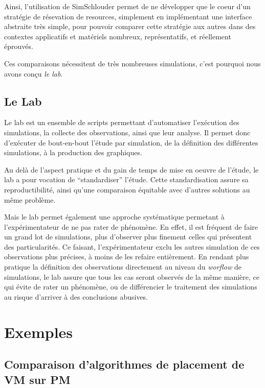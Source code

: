 \documentclass[parallelisme]{compas2017}
\begin{document}
Ainsi, l'utilisation de SimSchlouder permet de ne développer que le coeur d'un stratégie de résevation 
de resources, simplement en implémentant une interface abstraite très simple, pour pouvoir comparer cette 
stratégie aux autres dans des contextes applicatifs et matériels nombreux, représentatifs, et réellement 
éprouvés.

Ces comparaisons nécessitent de très nombreuses simulations, c'est pourquoi nous avons conçu \emph{le lab}.

\subsection{Le Lab}

Le lab est un ensemble de scripts permettant d'automatiser l'exécution des simulations, la collecte des
observations, ainsi que leur analyse. Il permet donc d'exécuter de bout-en-bout l'étude par simulation,
de la définition des différentes simulations, à la production des graphiques.

Au delà de l'aspect pratique et du gain de temps de mise en oeuvre de l'étude, le lab a pour vocation
de ``standardiser'' l'étude. Cette standardisation assure sa reproductibilité, ainsi qu'une comparaison
équitable avec d'autres solutions au même problème.

Mais le lab permet également une approche systématique permetant à l'expérimentateur de ne pas rater 
de phénomène. En effet, il est fréquent de faire un grand lot de simulations, plus d'observer plus
finement celles qui présentent des particularités. Ce faisant, l'expérimentateur exclu les autres 
simulation de ces observations plus précises, à moins de les refaire entièrement. En rendant plus 
pratique la définition des observations directement au niveau du \textit{worflow} de simulations, 
le lab assure que tous les cas seront observés de la même manière, ce qui évite de rater un phénomène,
ou de différencier le traitement des simulations au risque d'arriver à des conclusions abusives.


\section{Exemples}

\subsection{Comparaison d'algorithmes de placement de VM sur PM}
\end{document}
